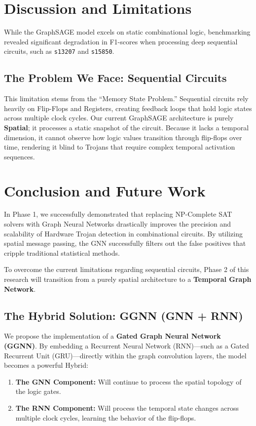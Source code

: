 \documentclass[conference]{IEEEtran}
\begin{document}
\section{Discussion and Limitations}
While the GraphSAGE model excels on static combinational logic, benchmarking revealed significant degradation in F1-scores when processing deep sequential circuits, such as \texttt{s13207} and \texttt{s15850}.

\subsection{The Problem We Face: Sequential Circuits}
This limitation stems from the ``Memory State Problem.'' Sequential circuits rely heavily on Flip-Flops and Registers, creating feedback loops that hold logic states across multiple clock cycles. Our current GraphSAGE architecture is purely \textbf{Spatial}; it processes a static snapshot of the circuit. Because it lacks a temporal dimension, it cannot observe how logic values transition through flip-flops over time, rendering it blind to Trojans that require complex temporal activation sequences.

\section{Conclusion and Future Work}
In Phase 1, we successfully demonstrated that replacing NP-Complete SAT solvers with Graph Neural Networks drastically improves the precision and scalability of Hardware Trojan detection in combinational circuits. By utilizing spatial message passing, the GNN successfully filters out the false positives that cripple traditional statistical methods.

To overcome the current limitations regarding sequential circuits, Phase 2 of this research will transition from a purely spatial architecture to a \textbf{Temporal Graph Network}. 

\subsection{The Hybrid Solution: GGNN (GNN + RNN)}
We propose the implementation of a \textbf{Gated Graph Neural Network (GGNN)}. By embedding a Recurrent Neural Network (RNN)—such as a Gated Recurrent Unit (GRU)—directly within the graph convolution layers, the model becomes a powerful Hybrid:
\begin{enumerate}
    \item \textbf{The GNN Component:} Will continue to process the spatial topology of the logic gates.
    \item \textbf{The RNN Component:} Will process the temporal state changes across multiple clock cycles, learning the behavior of the flip-flops.
\end{enumerate}
\end{document}
